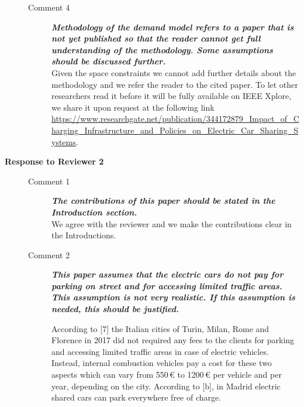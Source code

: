 \documentclass{paper}
\newcommand{\rev}[1]{\textbf{\textit{#1}}}
\newcommand{\ans}[1]{{\color{blue} #1}}
\begin{document}
\begin{description}
\begin{description}
\item[Comment 4] \rev{Methodology of the demand model refers to a paper that is not yet published so that the reader cannot get full understanding of the methodology. Some assumptions should be discussed further.}\\

\ans{Given the space constraints we cannot add further details about the methodology and we refer the reader to the cited paper. To let other researchers read it before it will be fully available on IEEE Xplore, we share it upon request at the following link \url{https://www.researchgate.net/publication/344172879_Impact_of_Charging_Infrastructure_and_Policies_on_Electric_Car_Sharing_Systems}.}


\end{description}

\pagebreak

\item[\textbf{Response to Reviewer 2}] \hfill
\begin{description}

\item[Comment 1] \rev{The contributions of this paper should be stated in the Introduction section.}\\

\ans{We agree with the reviewer and we make the contributions clear in the Introductions.%
} \\

\item[Comment 2] \rev{This paper assumes that the electric cars do not pay for parking on street and for accessing limited traffic areas. This assumption is not very realistic. If this assumption is needed, this should be justified.}\\

\ans{

According to [7] the Italian cities of Turin, Milan, Rome and Florence in 2017 did not required any fees to the clients for parking and accessing limited traffic areas  in case of electric vehicles.
Instead, internal combustion vehicles pay a cost for these two aspects which can vary from 550\,\euro{} to 1200\,\euro{} per vehicle and per year, depending on the city.
According to [b], in Madrid electric shared cars can park everywhere free of charge. 

}
\end{description}
\end{description}
\end{document}
